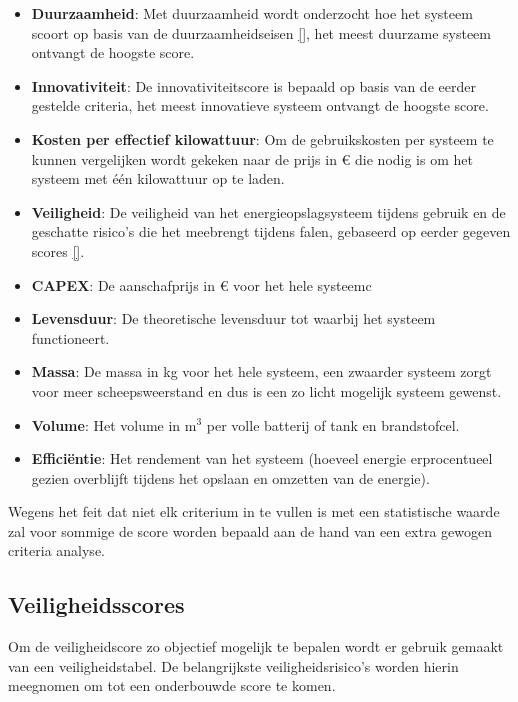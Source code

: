 \begin{itemize}
    \item \textbf{Duurzaamheid}: Met duurzaamheid wordt onderzocht hoe het systeem scoort op basis van de duurzaamheidseisen \ref{}, het meest duurzame systeem ontvangt de hoogste score.
    \item \textbf{Innovativiteit}: De innovativiteitscore is bepaald op basis van de eerder gestelde criteria, het meest innovatieve systeem ontvangt de hoogste score.
    \item \textbf{Kosten per effectief kilowattuur}: Om de gebruikskosten per systeem te kunnen  vergelijken wordt gekeken naar de prijs in $€$ die nodig is om het systeem met één kilowattuur op te laden.
    \item \textbf{Veiligheid}: De veiligheid van het energieopslagsysteem tijdens gebruik en de geschatte risico's die het meebrengt tijdens falen, gebaseerd op eerder gegeven scores \ref{}.
    \item \textbf{CAPEX}: De aanschafprijs in $€$ voor het hele systeemc
    \item \textbf{Levensduur}: De theoretische levensduur tot waarbij het systeem functioneert. 
    \item \textbf{Massa}: De massa in kg voor het hele systeem, een zwaarder systeem zorgt voor meer scheepsweerstand en dus is een zo licht mogelijk systeem gewenst.
    \item \textbf{Volume}: Het volume in m$^3$ per volle batterij of tank en brandstofcel.
    \item \textbf{Efficiëntie}: Het rendement van het systeem (hoeveel energie erprocentueel gezien overblijft tijdens het opslaan en omzetten van de energie).
\end{itemize}


\vspace{4mm}
\noindent Wegens het feit dat niet elk criterium in te vullen is met een statistische waarde zal voor sommige de score worden bepaald aan de hand van een extra gewogen criteria analyse.

\subsection*{Veiligheidsscores}

\noindent Om de veiligheidscore zo objectief mogelijk te bepalen wordt er gebruik gemaakt van een veiligheidstabel. De belangrijkste veiligheidsrisico's worden hierin meegnomen om tot een onderbouwde score te komen.


